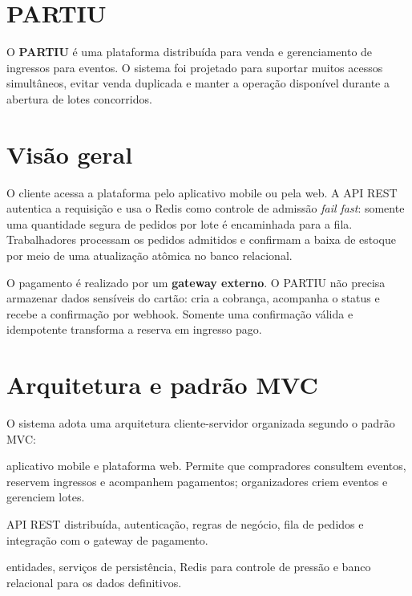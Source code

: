 \documentclass[12pt,a4paper]{article}
\begin{document}
\section*{PARTIU}

O \textbf{PARTIU} \'e uma plataforma distribu\'ida para venda e gerenciamento de ingressos para eventos. O sistema foi projetado para suportar muitos acessos simult\^aneos, evitar venda duplicada e manter a opera\c{c}\~ao dispon\'ivel durante a abertura de lotes concorridos.

\section{Vis\~ao geral}

O cliente acessa a plataforma pelo aplicativo mobile ou pela web. A API REST autentica a requisi\c{c}\~ao e usa o Redis como controle de admiss\~ao \textit{fail fast}: somente uma quantidade segura de pedidos por lote \'e encaminhada para a fila. Trabalhadores processam os pedidos admitidos e confirmam a baixa de estoque por meio de uma atualiza\c{c}\~ao at\^omica no banco relacional.

O pagamento \'e realizado por um \textbf{gateway externo}. O PARTIU n\~ao precisa armazenar dados sens\'iveis do cart\~ao: cria a cobran\c{c}a, acompanha o status e recebe a confirma\c{c}\~ao por webhook. Somente uma confirma\c{c}\~ao v\'alida e idempotente transforma a reserva em ingresso pago.

\section{Arquitetura e padr\~ao MVC}

O sistema adota uma arquitetura cliente-servidor organizada segundo o padr\~ao MVC:

\begin{description}[style=multiline,leftmargin=3.2cm,labelwidth=2.5cm]
  \item[View] aplicativo mobile e plataforma web. Permite que compradores consultem eventos, reservem ingressos e acompanhem pagamentos; organizadores criem eventos e gerenciem lotes.
  \item[Controller] API REST distribu\'ida, autentica\c{c}\~ao, regras de neg\'ocio, fila de pedidos e integra\c{c}\~ao com o gateway de pagamento.
  \item[Model] entidades, servi\c{c}os de persist\^encia, Redis para controle de press\~ao e banco relacional para os dados definitivos.
\end{description}
\end{document}
